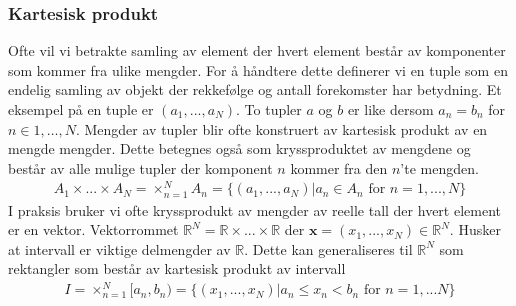 \subsubsection{Kartesisk produkt}
Ofte vil vi betrakte samling av element der hvert element består av komponenter som kommer fra ulike mengder. For å håndtere dette definerer vi en tuple som en endelig samling av objekt der rekkefølge og antall forekomster har betydning. Et eksempel på en tuple er $(a_1,...,a_N)$. To tupler $a$ og $b$ er like dersom $a_n = b_n$ for $n \in {1,\dots, N}$. Mengder av tupler blir ofte konstruert av kartesisk produkt av en mengde mengder. Dette betegnes også som kryssproduktet av mengdene og består av alle mulige tupler der komponent $n$ kommer fra den $n$'te mengden. 
\begin{align}
A_1\times...\times A_N =\times_{n=1}^N A_n =  \{(a_1,...,a_N)|a_n \in A_n \text{ for } n=1,...,N\}
\end{align}
I praksis bruker vi ofte kryssprodukt av mengder av reelle tall der hvert element er en vektor. Vektorrommet $\mathbb{R}^N=\mathbb{R}\times ... \times \mathbb{R}$ der $\mathbf{x}=(x_1,...,x_N) \in \mathbb{R}^N$. Husker at intervall er viktige delmengder av $\mathbb{R}$. Dette kan generaliseres til $\mathbb{R}^N$ som rektangler som består av kartesisk produkt av intervall
\begin{align}
I = \times_{n=1}^N[a_n,b_n) = \{(x_1,...,x_N)|a_n\leq x_n <b_n \text{ for } n=1,...N\}
\end{align}
